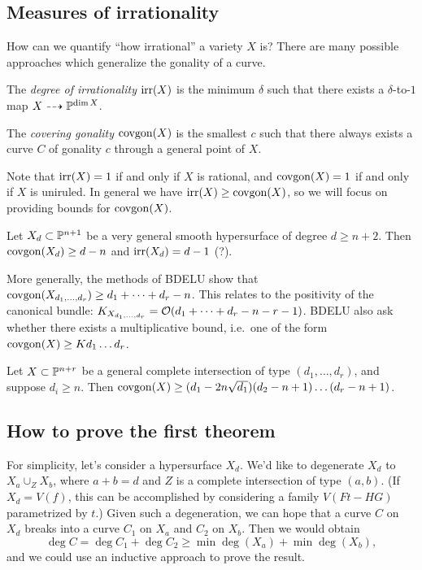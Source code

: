 \documentclass{article}
\begin{document}
\subsection{Measures of irrationality}

How can we quantify ``how irrational'' a variety $X$ is?
There are many possible approaches which generalize the gonality of a curve.

\begin{dfn}
	The \emph{degree of irrationality} $\operatorname{irr}(X)$ is the minimum $\delta$ such that there exists a $\delta$-to-$1$ map $X \dashrightarrow \mathbb{P}^{\dim X}$.
\end{dfn}

\begin{dfn}
	The \emph{covering gonality} $\operatorname{covgon}(X)$ is the smallest $c$ such that there always exists a curve $C$ of gonality $c$ through a general point of $X$.
\end{dfn}

Note that $\operatorname{irr}(X) = 1$ if and only if $X$ is rational, and $\operatorname{covgon}(X) = 1$ if and only if $X$ is uniruled.
In general we have $\operatorname{irr}(X) \geq \operatorname{covgon}(X)$, so we will focus on providing bounds for $\operatorname{covgon}(X)$.

\begin{thm}[BDELU, 2017]
	Let $X_d \subset \mathbb{P}^{n+1}$ be a very general smooth hypersurface of degree $d \geq n+2$.
	Then $\operatorname{covgon}(X_d) \geq d - n$ and $\operatorname{irr}(X_d) = d - 1$ (?).
\end{thm}

More generally, the methods of BDELU show that $\operatorname{covgon}(X_{d_1,\dots,d_r}) \geq d_1 + \dots + d_r - n$.
This relates to the positivity of the canonical bundle: $K_{X_{d_1,\dots,d_r}} = \mathcal{O}(d_1 + \dots + d_r - n - r - 1)$.
BDELU also ask whether there exists a multiplicative bound, i.e.\ one of the form $\operatorname{covgon}(X) \geq K d_1 \dots d_r$.

\begin{thm}
	Let $X \subset \mathbb{P}^{n+r}$ be a general complete intersection of type $(d_1, \dots, d_r)$, and suppose $d_i \geq n$.
	Then $\operatorname{covgon}(X) \geq (d_1 - 2n \sqrt{d_1}) (d_2 - n + 1) \dots (d_r - n + 1)$.
\end{thm}

\subsection{How to prove the first theorem}

For simplicity, let's consider a hypersurface $X_d$.
We'd like to degenerate $X_d$ to $X_a \cup_Z X_b$, where $a + b = d$ and $Z$ is a complete intersection of type $(a, b)$.
(If $X_d = V(f)$, this can be accomplished by considering a family $V(Ft - HG)$ parametrized by $t$.)
Given such a degeneration, we can hope that a curve $C$ on $X_d$ breaks into a curve $C_1$ on $X_a$ and $C_2$ on $X_b$.
Then we would obtain
\[
	\deg C = \deg C_1 + \deg C_2 \geq \min \deg(X_a) + \min \deg (X_b),
\]
and we could use an inductive approach to prove the result.
\end{document}
